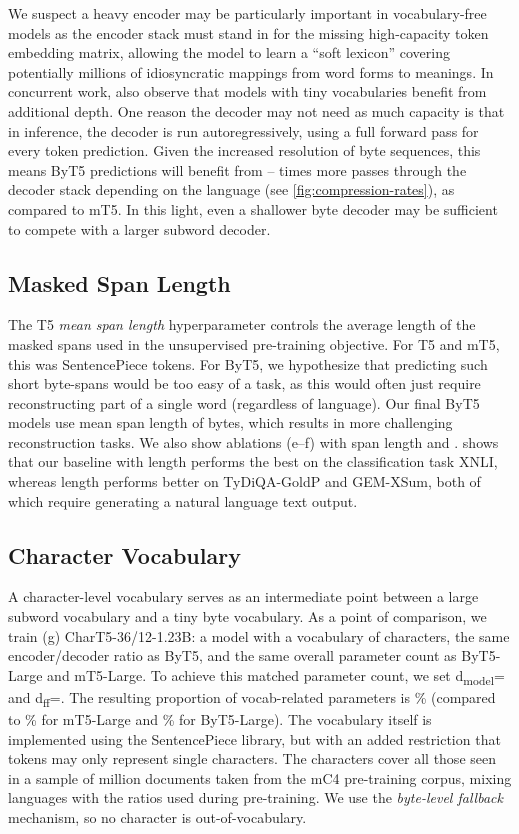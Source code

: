 \documentclass[11pt,a4paper]{article}
\begin{document}
We suspect a heavy encoder may be particularly important in vocabulary-free models as the encoder stack must stand in for the missing high-capacity token embedding matrix, allowing the model to learn a ``soft lexicon'' covering potentially millions of idiosyncratic mappings from word forms to meanings.
In concurrent work, \citet{wies-2021-transformer} also observe that models with tiny vocabularies benefit from additional depth. One reason the decoder may not need as much capacity is that in inference, the decoder is run autoregressively, using a full forward pass for every token prediction. Given the increased resolution of byte sequences, this means ByT5 predictions will benefit from -- times more passes through the decoder stack depending on the language (see \cref{fig:compression-rates}), as compared to mT5. In this light, even a shallower byte decoder may be sufficient to compete with a larger subword decoder.

\subsection{Masked Span Length}

The T5 \textit{mean span length} hyperparameter controls the average length of the masked spans used in the unsupervised pre-training objective. For T5 and mT5, this was  SentencePiece tokens. For ByT5, we hypothesize that predicting such short byte-spans would be too easy of a task, as this would often just require reconstructing part of a single word (regardless of language). Our final ByT5 models use mean span length of  bytes, which results in more challenging reconstruction tasks. We also show ablations (e--f) with span length  and .  shows that our baseline with length  performs the best on the classification task XNLI, whereas length  performs better on TyDiQA-GoldP and \mbox{GEM-XSum}, both of which require generating a natural language text output.

\subsection{Character Vocabulary}

A character-level vocabulary serves as an intermediate point between a large subword vocabulary and a tiny byte vocabulary. As a point of comparison, we train (g) CharT5-36/12-1.23B: a model with a vocabulary of  characters, the same encoder/decoder ratio as ByT5, and the same overall parameter count as ByT5-Large and mT5-Large. To achieve this matched parameter count, we set d\textsubscript{model}= and d\textsubscript{ff}=. The resulting proportion of vocab-related parameters is \% (compared to \% for mT5-Large and \% for ByT5-Large). The vocabulary itself is implemented using the SentencePiece library, but with an added restriction that tokens may only represent single characters. The characters cover all those seen in a sample of  million documents taken from the mC4 pre-training corpus, mixing languages with the ratios used during pre-training. We use the \textit{byte-level fallback} mechanism, so no character is out-of-vocabulary.
\end{document}
